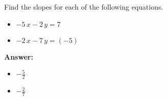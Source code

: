  Find the slopes for each of the following equations. \begin{itemize}\item \( -5 \, x - 2 \, y = 7 \)\item \( -2 \, x - 7 \, y = \left(-5\right) \)\end{itemize}

        \textbf{Answer:} \begin{itemize}\item \( -\frac{5}{2} \)\item \( -\frac{2}{7} \)\end{itemize}
